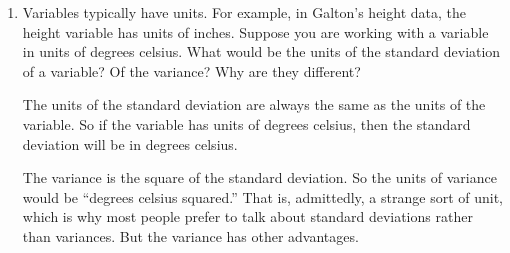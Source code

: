 \begin{enumerate}
\item Variables typically have units.  For example, in Galton's height
data, the height variable has units of inches.  Suppose you are working
with a variable in units of degrees celsius.
What would be the units of the standard deviation of a variable?  Of
the variance? Why are they different? \TextEntry[itemname=units]

\begin{AnswerText}
The units of the standard deviation are always the same as the units
of the variable.  So if the variable has units of degrees celsius,
then the standard deviation will be in degrees celsius.

The variance is the square of the standard deviation.  So the units of
variance would be ``degrees celsius squared.''  That is, admittedly, a
strange sort of unit, which is why most people prefer to talk about
standard deviations rather than variances.  But the variance has other
advantages.
\end{AnswerText}

\end{enumerate}
